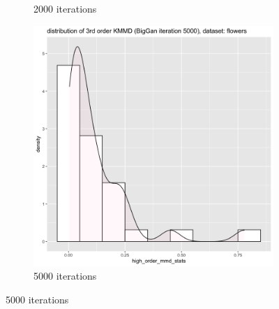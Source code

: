 \documentclass{article}
\begin{document}
\begin{figure}[h!]
\begin{subfigure}[b]{0.3\textwidth}
         \caption{2000 iterations}
     \end{subfigure}
     \hfill
     \begin{subfigure}[b]{0.3\textwidth}
         \centering
         \includegraphics[width=\textwidth]{kmmd_figures/biggan_flower_highdist_5000.png}
         \caption{5000 iterations}
     \end{subfigure}
\end{figure}
\end{document}
